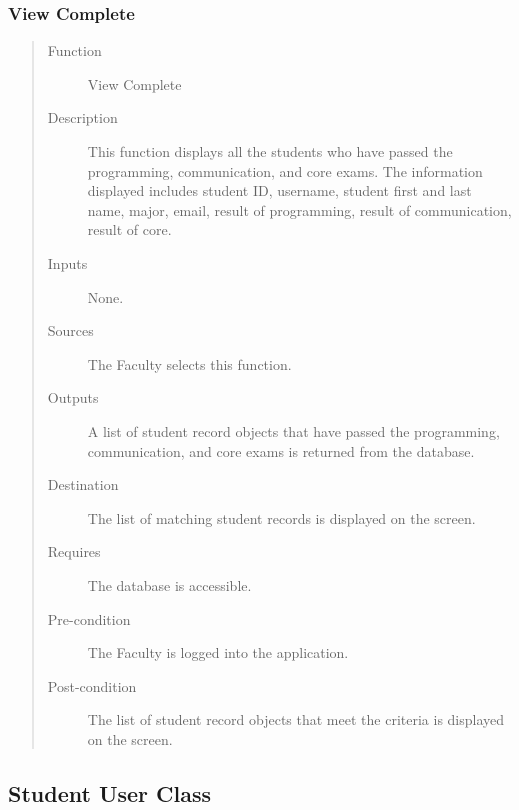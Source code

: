 \subsubsection{View Complete}  
\begin{quote} %
\begin{description}
\item[Function]
   View Complete
\item[Description]
   This function displays all the students who have passed the programming,
   communication, and core exams. The information displayed includes student ID,
   username, student first and last name, major, email, result of programming,
   result of communication, result of core.
\item[Inputs]
   None.
\item[Sources]
   The Faculty selects this function.
\item[Outputs]
   A list of student record objects that have passed the programming,
   communication, and core exams is returned from the database.
\item[Destination]
   The list of matching student records is displayed on the screen.
\item[Requires]
   The database is accessible.
\item[Pre-condition]
   The Faculty is logged into the application.
\item[Post-condition]
   The list of student record objects that meet the criteria is displayed on the
   screen.
\end{description}
\end{quote} %

\subsection{Student User Class}
